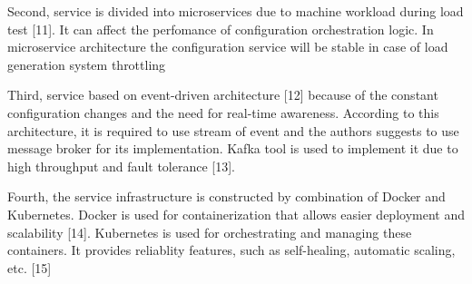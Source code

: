 Second, service is divided into microservices due to machine workload during load test [11].
It can affect the perfomance of configuration orchestration logic.
In microservice architecture the configuration service will be stable in case of load generation system throttling

Third, service based on event-driven architecture [12] because of the constant configuration changes and the need for real-time awareness.
According to this architecture, it is required to use stream of event and the authors suggests to use message broker for its implementation.
Kafka tool is used to implement it due to high throughput and fault tolerance [13].

Fourth, the service infrastructure is constructed by combination of Docker and Kubernetes.
Docker is used for containerization that allows easier deployment and scalability [14].
Kubernetes is used for orchestrating and managing these containers.
It provides reliablity features, such as self-healing, automatic scaling, etc. [15]

